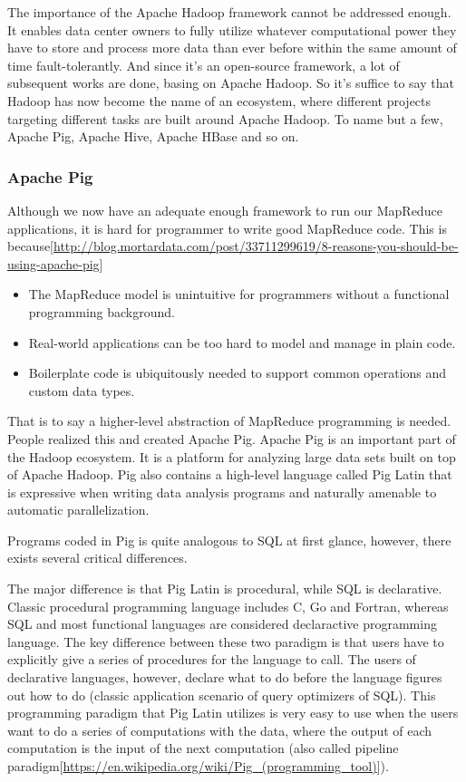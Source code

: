 \documentclass{article}
\begin{document}
The importance of the Apache Hadoop framework cannot be addressed enough. It enables data center owners to fully utilize whatever computational power they have to store and process more data than ever before within the same amount of time fault-tolerantly. And since it's an open-source framework, a lot of subsequent works are done, basing on Apache Hadoop. So it's suffice to say that Hadoop has now become the name of an ecosystem, where different projects targeting different tasks are built around Apache Hadoop. To name but a few, Apache Pig, Apache Hive, Apache HBase and so on.

\subsubsection{Apache Pig}

Although we now have an adequate enough framework to run our MapReduce applications, it is hard for programmer to write good MapReduce code. This is because[\url{http://blog.mortardata.com/post/33711299619/8-reasons-you-should-be-using-apache-pig}]
\begin{itemize}
\item The MapReduce model is unintuitive for programmers without a functional programming background.
\item Real-world applications can be too hard to model and manage in plain code.
\item Boilerplate code is ubiquitously needed to support common operations and custom data types.
\end{itemize}

That is to say a higher-level abstraction of MapReduce programming is needed. People realized this and created Apache Pig. Apache Pig is an important part of the Hadoop ecosystem. It is a platform for analyzing large data sets built on top of Apache Hadoop. Pig also contains a high-level language called Pig Latin that is expressive when writing data analysis programs and naturally amenable to automatic parallelization.

Programs coded in Pig is quite analogous to SQL at first glance, however, there exists several critical differences.

The major difference is that Pig Latin is procedural, while SQL is declarative. Classic procedural programming language includes C, Go and Fortran, whereas SQL and most functional languages are considered declaractive programming language. The key difference between these two paradigm is that users have to explicitly give a series of procedures for the language to call. The users of declarative languages, however, declare what to do before the language figures out how to do (classic application scenario of query optimizers of SQL). This programming paradigm that Pig Latin utilizes is very easy to use when the users want to do a series of computations with the data, where the output of each computation is the input of the next computation (also called pipeline paradigm[\url{https://en.wikipedia.org/wiki/Pig_(programming_tool)}]).
\end{document}
